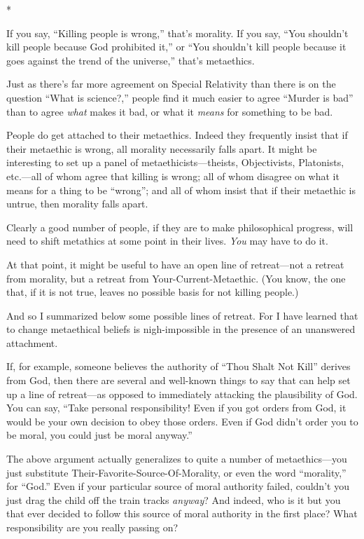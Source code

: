 {\centering
 *
\par}


{
 If you say, ``Killing people is
wrong,'' that's morality. If you say,
``You shouldn't kill people because
God prohibited it,'' or ``You
shouldn't kill people because it goes against the trend
of the universe,'' that's
metaethics.}

{
 Just as there's far more agreement on Special
Relativity than there is on the question ``What is
science?,'' people find it much easier to agree
``Murder is bad'' than to agree
\textit{what} makes it bad, or what it \textit{means} for something to
be bad.}

{
 People do get attached to their metaethics. Indeed they frequently
insist that if their metaethic is wrong, all morality necessarily falls
apart. It might be interesting to set up a panel of
metaethicists---theists, Objectivists, Platonists, etc.---all of whom
agree that killing is wrong; all of whom disagree on what it means for
a thing to be ``wrong''; and all of
whom insist that if their metaethic is untrue, then morality falls
apart.}

{
 Clearly a good number of people, if they are to make philosophical
progress, will need to shift metathics at some point in their lives.
\textit{You} may have to do it.}

{
 At that point, it might be useful to have an open line of
retreat---not a retreat from morality, but a retreat from
Your-Current-Metaethic. (You know, the one that, if it is not true,
leaves no possible basis for not killing people.)}

{
 And so I summarized below some possible lines of retreat. For I
have learned that to change metaethical beliefs is nigh-impossible in
the presence of an unanswered attachment.}

{
 If, for example, someone believes the authority of
``Thou Shalt Not Kill'' derives from
God, then there are several and well-known things to say that can help
set up a line of retreat---as opposed to immediately attacking the
plausibility of God. You can say, ``Take personal
responsibility! Even if you got orders from God, it would be your own
decision to obey those orders. Even if God didn't order
you to be moral, you could just be moral anyway.''}

{
 The above argument actually generalizes to quite a number of
metaethics---you just substitute Their-Favorite-Source-Of-Morality, or
even the word ``morality,'' for
``God.'' Even if your particular
source of moral authority failed, couldn't you just
drag the child off the train tracks \textit{anyway}? And indeed, who is
it but you that ever decided to follow this source of moral authority
in the first place? What responsibility are you really passing on?}

